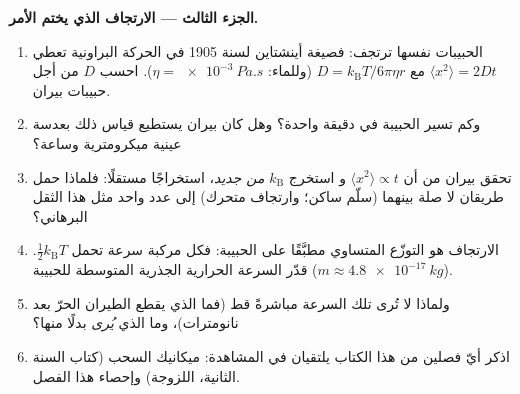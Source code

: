 \begin{problem}
\medskip\noindent\textbf{الجزء الثالث --- الارتجاف الذي يختم الأمر.}
\begin{enumerate}[resume]
  \item الحبيبات نفسها ترتجف: فصيغة أينشتاين لسنة 1905 في
        الحركة البراونية تعطي $\langle x^2\rangle = 2Dt$ مع $D =
        k_{\text{B}}T/6\pi\eta r$ (وللماء: $\eta =
        \qty{e-3}{Pa.s}$). احسب $D$ من أجل حبيبات بيران.
  \item وكم تسير الحبيبة في دقيقة واحدة؟ وهل كان بيران يستطيع
        قياس ذلك بعدسة عينية ميكرومترية وساعة؟
  \item تحقق بيران من أن $\langle x^2\rangle \propto t$ و
        استخرج $k_{\text{B}}$ \emph{من جديد}، استخراجًا مستقلًا:
        فلماذا حمل طريقان لا صلة بينهما (سلّم ساكن؛ وارتجاف
        متحرك) إلى عدد واحد مثل هذا الثقل البرهاني؟
  \item الارتجاف هو التوزّع المتساوي مطبَّقًا على الحبيبة: فكل
        مركبة سرعة تحمل $\tfrac12 k_{\text{B}}T$.
        قدّر السرعة الحرارية الجذرية المتوسطة للحبيبة ($m \approx
        \qty{4.8e-17}{kg}$).
  \item ولماذا لا تُرى تلك السرعة مباشرةً قط (فما الذي يقطع
        الطيران الحرّ بعد نانومترات)، وما الذي \emph{يُرى}
        بدلًا منها؟
  \item اذكر أيّ فصلين من هذا الكتاب يلتقيان في
        المشاهدة: ميكانيك السحب (كتاب السنة الثانية،
        اللزوجة) وإحصاء هذا الفصل.
\end{enumerate}


\end{problem}
